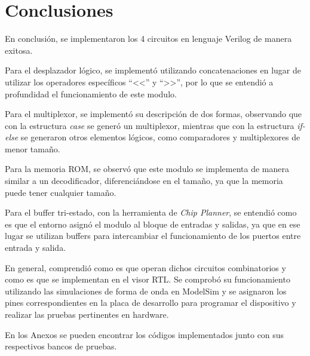 \section{Conclusiones}
En conclusión, se implementaron los 4 circuitos en lenguaje Verilog de manera exitosa.

Para el desplazador lógico, se implementó utilizando concatenaciones en lugar de utilizar los operadores específicos ``<<'' y ``>>'', por lo que se entendió a profundidad el funcionamiento de este modulo. 

Para el multiplexor, se implementó su descripción de dos formas, observando que con la estructura \textit{case} se generó un multiplexor, mientras que con la estructura \textit{if-else} se generaron otros elementos lógicos, como comparadores y multiplexores de menor tamaño.

Para la memoria ROM, se observó que este modulo se implementa de manera similar a un decodificador, diferenciándose en el tamaño, ya que la memoria puede tener cualquier tamaño.

Para el buffer tri-estado, con la herramienta de \textit{Chip Planner}, se entendió como es que el entorno asignó el modulo al bloque de entradas y salidas, ya que en ese lugar se utilizan buffers para intercambiar el funcionamiento de los puertos entre entrada y salida.

En general, comprendió como es que operan dichos circuitos combinatorios y como es que se implementan en el visor RTL. Se comprobó su funcionamiento utilizando las simulaciones de forma de onda en ModelSim y se asignaron los pines correspondientes en la placa de desarrollo para programar el dispositivo y realizar las pruebas pertinentes en hardware.

En los Anexos se pueden encontrar los códigos implementados junto con sus respectivos bancos de pruebas.